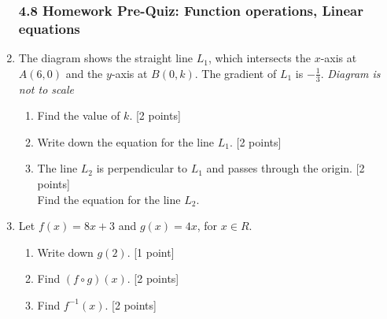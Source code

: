 \documentclass[12pt, twoside]{article}
\begin{document}
\begin{enumerate}
    \subsubsection*{4.8 Homework Pre-Quiz: Function operations, Linear equations}

    \item The diagram shows the straight line $L_1$, which intersects the $x$-axis at $A(6, 0)$ and the $y$-axis at $B(0,k)$. The gradient of $L_1$ is $-\frac{1}{3}$. \hfill \emph{Diagram is not to scale}
        \begin{center}
        \end{center}
        \begin{enumerate}%
            \item Find the value of $k$. \hfill [2 points]
            \item Write down the equation for the line $L_1$. \hfill [2 points]
            \item The line $L_2$ is perpendicular to $L_1$ and passes through the origin. \hfill [2 points]\\[0.2cm]
            Find the equation for the line $L_2$.
        \end{enumerate}

    \item Let $f(x)=8x+3$ and $g(x)=4x$, for $x \in R$.
        \begin{enumerate}
            \item Write down  $g(2)$. \hfill [1 point]
            \item Find $(f \circ g)(x)$. \hfill [2 points]
            \item Find $f^{-1}(x)$. \hfill [2 points]
        \end{enumerate}


\end{enumerate}
\end{document}
